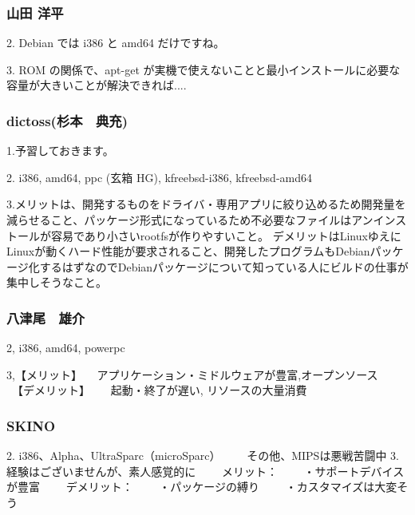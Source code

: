 \documentclass[cjk,dvipdfmx,12pt,%
hyperref={bookmarks=true,bookmarksnumbered=true,bookmarksopen=false,%
colorlinks=false,%
pdftitle={第38回関西Debian勉強会},%
pdfauthor={倉敷・のがた・佐々木},%
pdfsubject={資料},%
}]{beamer}
\begin{document}
\begin{frame}[fragile]
\frametitle{ 山田 洋平 }



\begin{verbatimtab}
2. Debian では i386 と amd64 だけですね。

3. ROM の関係で、apt-get が実機で使えないことと最小インストールに必要な容量が大きいことが解決できれば....
\end{verbatimtab}


\end{frame}



\begin{frame}[fragile]
\frametitle{ dictoss(杉本　典充) }


{\small
\begin{verbatimtab}

1.予習しておきます。

2. i386, amd64, ppc (玄箱 HG), kfreebsd-i386,
   kfreebsd-amd64

3.メリットは、開発するものをドライバ・専用アプリに絞り込めるため開発量を減らせること、パッケージ形式になっているため不必要なファイルはアンインストールが容易であり小さいrootfsが作りやすいこと。
  デメリットはLinuxゆえにLinuxが動くハード性能が要求されること、開発したプログラムもDebianパッケージ化するはずなのでDebianパッケージについて知っている人にビルドの仕事が集中しそうなこと。
\end{verbatimtab}
}

\end{frame}


\begin{frame}[fragile]
\frametitle{ 八津尾　雄介 }



\begin{verbatimtab}
2, i386, amd64, powerpc

3,【メリット】
　アプリケーション・ミドルウェアが豊富,オープンソース
　【デメリット】　
　起動・終了が遅い, リソースの大量消費
\end{verbatimtab}

\end{frame}



\begin{frame}[fragile]
\frametitle{ SKINO }



\begin{verbatimtab}
2. i386、Alpha、UltraSparc（microSparc）
　　その他、MIPSは悪戦苦闘中
3. 経験はございませんが、素人感覚的に
　　メリット：
　　・サポートデバイスが豊富
　　デメリット：
　　・パッケージの縛り
　　・カスタマイズは大変そう
\end{verbatimtab}


\end{frame}
\end{document}
